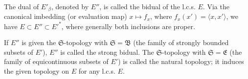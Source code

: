 The dual of $E'_\beta$, denoted by $E''$, is called the bidual of the l.c.s. $E$. Via the canonical imbedding (or evaluation map) $x \mapsto f_x$, where $f_x(x') = \langle x, x' \rangle$, we have $E \subset E'' \subset E'^*$, where generally both inclusions are proper.

If $E''$ is given the $\mathfrak{S}$-topology with $\mathfrak{S} = \mathfrak{B}$ (the family of strongly bounded subsets of $E'$), $E''$ is called the strong bidual. The $\mathfrak{S}$-topology with $\mathfrak{S} = \mathfrak{E}$ (the family of equicontinuous subsets of $E'$) is called the natural topology; it induces the given topology on $E$ for any l.c.s. $E$.
